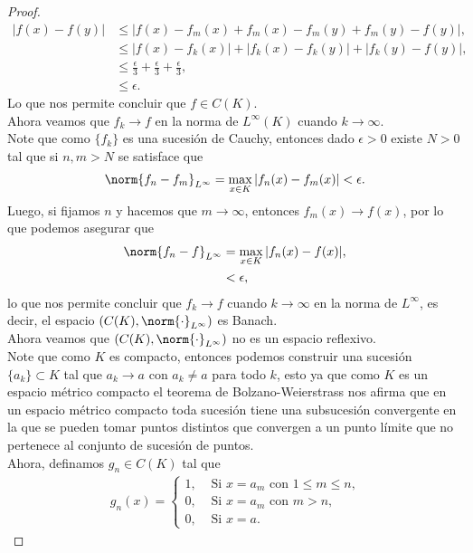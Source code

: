 \begin{proof}
  \begin{align*}
    |f(x)-f(y)|&\leq|f(x)-f_{m}(x)+f_{m}(x)-f_{m}(y)+f_{m}(y)-f(y)|,\\
    &\leq |f(x)-f_{k}(x)|+|f_{k}(x)-f_{k}(y)|+|f_{k}(y)-f(y)|,\\
    &\leq \frac{\epsilon}{3}+\frac{\epsilon}{3}+\frac{\epsilon}{3},\\
    &\leq \epsilon.
  \end{align*}
  Lo que nos permite concluir que $f\in C(K)$.\\
  Ahora veamos que $f_{k}\to f$ en la norma de $L^{\infty}(K)$ cuando $k\to\infty$.\\
  Note que como $\{f_{k}\}$ es una sucesión de Cauchy, entonces dado $\epsilon>0$ existe $N>0$ tal que si $n,m>N$ se satisface que
  \begin{align*}
    \norm{f_{n}-f_{m}}_{L^{\infty}}=\max_{x\in K}|f_{n}(x)-f_{m}(x)|<\epsilon.
  \end{align*}
  Luego, si fijamos $n$ y hacemos que $m\to \infty$, entonces $f_{m}(x)\to f(x)$, por lo que podemos asegurar que
  \begin{align*}
    \norm{f_{n}-f}_{L^{\infty}}&=\max_{x\in K}|f_{n}(x)-f(x)|,\\
    &<\epsilon,
  \end{align*}
  lo que nos permite concluir que $f_{k}\to f$ cuando $k\to \infty$ en la norma de $L^{\infty}$, es decir, el espacio $(C(K),\norm{\cdot}_{L^{\infty}})$ es Banach.\\
  Ahora veamos que $(C(K),\norm{\cdot}_{L^{\infty}})$ no es un espacio reflexivo.\\
  Note que como $K$ es compacto, entonces podemos construir una sucesión $\{a_{k}\}\subset K$ tal que $a_{k}\to a$ con $a_{k}\neq a$ para todo $k$, esto ya que como $K$ es un espacio métrico compacto el teorema de Bolzano-Weierstrass nos afirma que en un espacio métrico compacto toda sucesión tiene una subsucesión convergente en la que se pueden tomar puntos distintos que convergen a un punto límite que no pertenece al conjunto de sucesión de puntos.\\
  Ahora, definamos $g_{n}\in C(K)$ tal que 
  \begin{align*}
    g_{n}(x)= 
    \begin{cases}
      1, &\text{ Si $x=a_{m}$ con } 1\leq m\leq n \text{,} \\
      0, &\text{ Si $x=a_{m}$ con } m>n,\\
      0, &\text{ Si $x=a$}.
    \end{cases}

\end{align*}
\end{proof}
